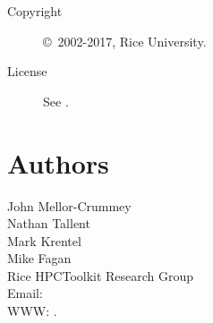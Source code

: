 \documentclass[english]{article}
\begin{document}
\begin{description}
\item[Copyright] \copyright\ 2002-2017, Rice University.
\item[License] See .
\end{description}

\section{Authors}

\noindent
John Mellor-Crummey \\
Nathan Tallent \\
Mark Krentel \\
Mike Fagan \\
Rice HPCToolkit Research Group \\
Email:  \\
WWW: .

\LatexManEnd
\end{document}
